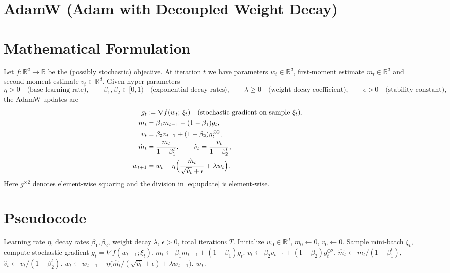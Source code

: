 \documentclass[11pt]{article}
\newcommand{\R}{\mathbb{R}}
\begin{document}
\section*{AdamW (Adam with Decoupled Weight Decay)}

\section*{Mathematical Formulation}
Let $f:\R^{d}\rightarrow\R$ be the (possibly stochastic) objective.  
At iteration $t$ we have parameters $w_t\in\R^{d}$, first‑moment estimate $m_t\in\R^{d}$ and second‑moment estimate $v_t\in\R^{d}$.  
Given hyper‑parameters
\[
\eta>0\quad\text{(base learning rate)},\qquad 
\beta_1,\beta_2\in[0,1)\quad\text{(exponential decay rates)},\qquad
\lambda\ge 0\quad\text{(weight‑decay coefficient)},\qquad
\epsilon>0\quad\text{(stability constant)},
\]
the AdamW updates are
\begin{align}
g_t &:= \nabla f(w_t;\,\xi_t) \quad\text{(stochastic gradient on sample }\xi_t), \label{eq:grad}\\
m_t &= \beta_1 m_{t-1} + (1-\beta_1) g_t, \label{eq:m}\\
v_t &= \beta_2 v_{t-1} + (1-\beta_2) g_t^{\odot 2}, \label{eq:v}\\
\hat m_t &= \frac{m_t}{1-\beta_1^{t}},\qquad 
\hat v_t = \frac{v_t}{1-\beta_2^{t}}, \label{eq:bias}\\
w_{t+1} &= w_t - \eta\Bigl(\frac{\hat m_t}{\sqrt{\hat v_t}+\epsilon} + \lambda w_t\Bigr). \label{eq:update}
\end{align}
Here $g^{\odot 2}$ denotes element‑wise squaring and the division in \eqref{eq:update} is element‑wise.

\section*{Pseudocode}
\begin{algorithm}[H]
\caption{AdamW}
\begin{algorithmic}[1]
\Require Learning rate $\eta$, decay rates $\beta_1,\beta_2$, weight decay $\lambda$, $\epsilon>0$, 
        total iterations $T$.
\State Initialize $w_0\in\R^{d}$, $m_0\gets 0$, $v_0\gets 0$.
    \State Sample mini‑batch $\xi_t$, compute stochastic gradient $g_t=\nabla f(w_{t-1};\xi_t)$.
    \State $m_t \gets \beta_1 m_{t-1} + (1-\beta_1) g_t$.
    \State $v_t \gets \beta_2 v_{t-1} + (1-\beta_2) g_t^{\odot 2}$.
    \State $\hat m_t \gets m_t/(1-\beta_1^{t})$, \ $\hat v_t \gets v_t/(1-\beta_2^{t})$.
    \State $w_t \gets w_{t-1} - \eta\bigl(\hat m_t/(\sqrt{\hat v_t}+\epsilon) + \lambda w_{t-1}\bigr)$.
\EndFor
\State \Return $w_T$.
\end{algorithmic}
\end{algorithm}
\end{document}
